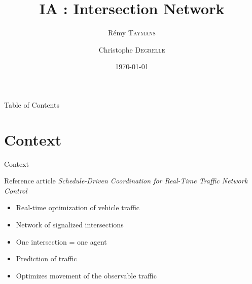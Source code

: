 \documentclass[]{beamer}
\author{Rémy \textsc{Taymans} \and Christophe \textsc{Degrelle}}
\title{IA : Intersection Network}
\institute{ECAM}
\date{\today}
\begin{document}
\begin{frame}
  \titlepage
\end{frame}

\begin{frame}{Table of Contents}
  \tableofcontents
\end{frame}

\section{Context}
\begin{frame}{Context}
\begin{block}{Reference article}
\centering
\emph{Schedule-Driven Coordination for Real-Time Traffic Network Control}
\end{block}


 \begin{itemize}
  \item Real-time optimization of vehicle traffic
  \item Network of signalized intersections
  \item One intersection = one agent
  \item Prediction of traffic
  \item Optimizes movement of the observable traffic
 \end{itemize}
\end{frame}
\end{document}
